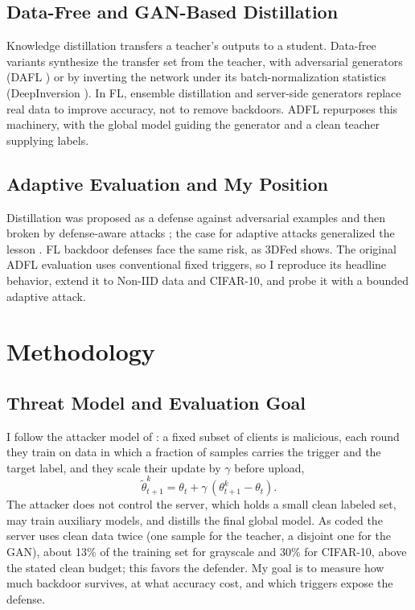 \documentclass[conference]{IEEEtran}
\begin{document}
\subsection{Data-Free and GAN-Based Distillation}
Knowledge distillation \cite{hinton2015kd} transfers a teacher's outputs to a student. Data-free variants synthesize the transfer set from the teacher, with adversarial generators (DAFL \cite{chen2019dafl}) or by inverting the network under its batch-normalization statistics (DeepInversion \cite{yin2020deepinversion}). In FL, ensemble distillation \cite{lin2020feddf} and server-side generators \cite{zhu2021datafree} replace real data to improve accuracy, not to remove backdoors. ADFL repurposes this machinery, with the global model guiding the generator and a clean teacher supplying labels.

\subsection{Adaptive Evaluation and My Position}
Distillation was proposed as a defense against adversarial examples \cite{papernot2016distillation} and then broken by defense-aware attacks \cite{carlini2017towards}; the case for adaptive attacks generalized the lesson \cite{tramer2020adaptive}. FL backdoor defenses face the same risk, as 3DFed shows. The original ADFL evaluation uses conventional fixed triggers, so I reproduce its headline behavior, extend it to Non-IID data and CIFAR-10, and probe it with a bounded adaptive attack.

\section{Methodology}
\subsection{Threat Model and Evaluation Goal}
I follow the attacker model of \cite{zhu2023adfl,bagdasaryan2020backdoor}: a fixed subset of clients is malicious, each round they train on data in which a fraction of samples carries the trigger and the target label, and they scale their update by $\gamma$ before upload,
\begin{equation}
\tilde\theta^k_{t+1}=\theta_t+\gamma\,(\theta^k_{t+1}-\theta_t).
\label{eq:scale}
\end{equation}
The attacker does not control the server, which holds a small clean labeled set, may train auxiliary models, and distills the final global model. As coded the server uses clean data twice (one sample for the teacher, a disjoint one for the GAN), about 13\% of the training set for grayscale and 30\% for CIFAR-10, above the stated clean budget; this favors the defender. My goal is to measure how much backdoor survives, at what accuracy cost, and which triggers expose the defense.
\end{document}
